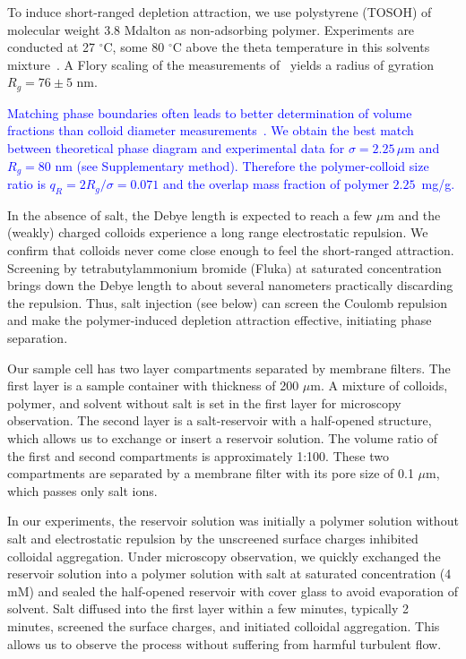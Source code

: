\documentclass[preprint,amsmath,amssymb,superscriptaddress]{revtex4-1}
\begin{document}
To induce short-ranged depletion attraction, we use polystyrene (TOSOH) of molecular weight 3.8 Mdalton as non-adsorbing polymer.
Experiments are conducted at 27 $^\circ$C, some 80 $^\circ$C above the theta temperature in this solvents mixture~\cite{Royall2007}. A Flory scaling of the measurements of~\cite{lu2008gelation} yields a radius of gyration $R_g=76\pm5$ nm.

\textcolor{blue}{Matching phase boundaries often leads to better determination of volume fractions than colloid diameter measurements~\cite{Poon2012}. We obtain the best match between theoretical phase diagram and experimental data for $\sigma=2.25\,\mu$m and $R_g=80$ nm (see Supplementary method). Therefore the polymer-colloid size ratio is $q_R=2R_g/\sigma=0.071$ and the overlap mass fraction of polymer $2.25$~mg/g.}

In the absence of salt, the Debye length is expected to reach a few $\mu$m and the (weakly) charged colloids experience a long range electrostatic repulsion. We confirm that colloids never come close enough to feel the short-ranged attraction. Screening by tetrabutylammonium bromide (Fluka) at saturated concentration brings down the Debye length to about several nanometers practically discarding the repulsion. 
Thus, salt injection (see below) can screen the Coulomb repulsion and make the polymer-induced depletion attraction effective, initiating phase separation. 

Our sample cell has two layer compartments separated by membrane filters. The first layer is a sample container with thickness of 200 $\mu$m. A mixture of colloids, polymer, and solvent without salt is  set in the first layer for microscopy observation. The second layer is a salt-reservoir with a half-opened structure, which allows us to exchange or insert a reservoir solution. The volume ratio of the first and second compartments is approximately 1:100. These two compartments are separated by a membrane filter with its pore size of 0.1 $\mu$m, which passes only salt ions. 

In our experiments, the reservoir solution was initially a polymer solution without salt and electrostatic repulsion by the unscreened surface charges inhibited colloidal aggregation. Under microscopy observation, we quickly exchanged the reservoir solution into a polymer solution with salt at saturated concentration (4 mM) and sealed the half-opened reservoir with cover glass to avoid evaporation of solvent. Salt diffused into the first layer within a few minutes, typically 2 minutes, screened the surface charges, and initiated colloidal aggregation. This allows us to observe the process without suffering from harmful turbulent flow. 
\end{document}
